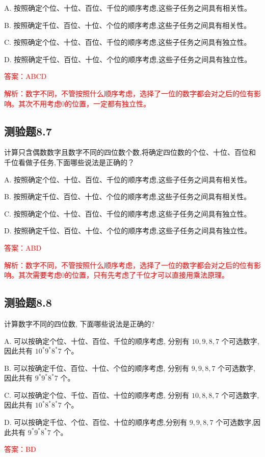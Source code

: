 \documentclass[UTF8, heading=true]{ctexart}
\begin{document}
A. 按照确定个位、十位、百位、千位的顺序考虑,这些子任务之间具有相关性。

B. 按照确定千位、百位、十位、个位的顺序考虑,这些子任务之间具有相关性。

C. 按照确定个位、十位、百位、千位的顺序考虑,这些子任务之间具有独立性。

D. 按照确定千位、百位、十位、个位的顺序考虑,这些子任务之间具有独立性。

\textcolor{red}{答案：ABCD}

\textcolor{red}{解析：数字不同，不管按照什么顺序考虑，选择了一位的数字都会对之后的位有影响。其次不用考虑0的位置，一定都有独立性。}

\subsection{测验题8.7}
计算只含偶数数字且数字不同的四位数个数,将确定四位数的个位、十位、百位和千位看做子任务,下面哪些说法是正确的？

A. 按照确定个位、十位、百位、千位的顺序考虑,这些子任务之间具有相关性。

B. 按照确定千位、百位、十位、个位的顺序考虑,这些子任务之间具有相关性。

C. 按照确定个位、十位、百位、千位的顺序考虑,这些子任务之间具有独立性。

D. 按照确定千位、百位、十位、个位的顺序考虑,这些子任务之间具有独立性。

\textcolor{red}{答案：ABD}

\textcolor{red}{解析：数字不同，不管按照什么顺序考虑，选择了一位的数字都会对之后的位有影响。其次需要考虑0的位置，只有先考虑了千位才可以直接用乘法原理。}


\subsection{测验题8.8}
计算数字不同的四位数, 下面哪些说法是正确的?

A. 可以按确定个位、十位、百位、千位的顺序考虑, 分别有 $10,9,8,7$ 个可选数字, 因此共有 $10^* 9 ^* 8^* 7$ 个。

B. 可以按确定千位、百位、十位、个位的顺序考虑, 分别有 $9,9,8,7$ 个可选数字,因此共有 $9^* 9^* 8^* 7$ 个。

C. 可以按确定个位、千位、百位、十位的顺序考虑, 分别有 $10,8,8,7$ 个可选数字, 因此共有 $10^* 8^* 8^* 7$ 个。

D. 可以按确定千位、个位、百位、十位的顺序考虑,分别有 $9,9,8,7$ 个可选数字,因此共有 $9^* 9^* 8^* 7$ 个。

\textcolor{red}{答案：BD}
\end{document}
